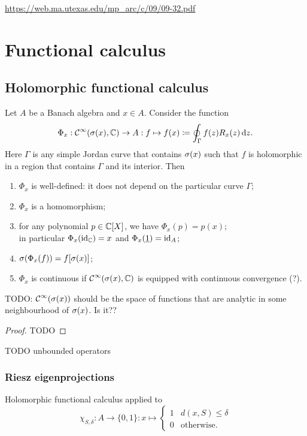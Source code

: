 \url{https://web.ma.utexas.edu/mp_arc/c/09/09-32.pdf}


\section{Functional calculus}
\subsection{Holomorphic functional calculus}

\begin{theorem} 
\label{holomorphicFunctionalCalculus} \label{holomorphicSpectralMapping}
Let $A$ be a Banach algebra and $x\in A$. Consider the function
\[ \Phi_x: \operatorname{\mathcal{C}}^\infty(\sigma(x),\mathbb{C}) \to A: f\mapsto f(x)\coloneqq \oint_\Gamma f(z)R_x(z)\operatorname{d \!}{z}. \]
Here $\Gamma$ is any simple Jordan curve that contains $\sigma(x)$ such that $f$ is holomorphic in a region that contains $\Gamma$ and its interior. Then
\begin{enumerate}
\item $\Phi_x$ is well-defined: it does not depend on the particular curve $\Gamma$;
\item $\Phi_x$ is a homomorphism;
\item for any polynomial $p\in \mathbb{C}[X]$, we have $\Phi_x(p) = p(x)$; \\
in particular $\Phi_x(\operatorname{id}_{\mathbb{C}}) = x$ and $\Phi_x(\underline{1}) = \operatorname{id}_A$;
\item $\sigma(\Phi_x(f)) = f[\sigma(x)]$;
\item $\Phi_x$ is continuous if $\operatorname{\mathcal{C}}^\infty(\sigma(x),\mathbb{C})$ is equipped with continuous convergence (?).
\end{enumerate}
\end{theorem}
TODO: $\operatorname{\mathcal{C}}^\infty(\sigma(x))$ should be the space of functions that are analytic in some neighbourhood of $\sigma(x)$. Is it??
\begin{proof}
TODO
\end{proof}

TODO unbounded operators

\subsubsection{Riesz eigenprojections}
Holomorphic functional calculus applied to
\[ \chi_{S,\delta}: A\to \{0,1\}: x\mapsto \begin{cases}
1 & d(x,S) \leq \delta \\
0 & \text{otherwise}.
\end{cases} \]

